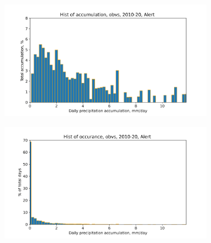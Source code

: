 \documentclass[draft]{agujournal2019}
\begin{document}
\begin{figure}[h!tbp]
    \begin{subfigure}{0.45\linewidth}
        \includegraphics[width=\linewidth]{figures/cdf_pdf/hist_accum_alert_10_20.png}
    \caption{}
    \end{subfigure}
\hfil
    \begin{subfigure}{0.45\linewidth}
        \includegraphics[width=\linewidth]{figures/cdf_pdf/hist_occurance_alert_10_20.png}
    \caption{}
    \end{subfigure}


\end{figure}
\end{document}
